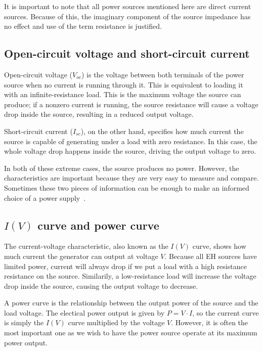\documentclass[a4paper,10pt]{article}
\begin{document}
It is important to note that all power sources mentioned here are direct current sources. Because of this, the imaginary component of the source impedance has no effect and use of the term resistance is justified. 

\subsection{Open-circuit voltage and short-circuit current}

Open-circuit voltage ($V_{oc}$) is the voltage between both terminals of the power source when no current is running through it. This is equivalent to loading it with an infinite-resistance load. This is the maximum voltage the source can produce; if a nonzero current is running, the source resistance will cause a voltage drop inside the source, resulting in a reduced output voltage. 

Short-circuit current ($I_{sc}$), on the other hand, specifies how much current the source is capable of generating under a load with zero resistance. In this case, the whole voltage drop happens inside the source, driving the output voltage to zero. 

In both of these extreme cases, the source produces no power. However, the characteristics are important because they are very easy to measure and compare. Sometimes these two pieces of information can be enough to make an informed choice of a power supply~\cite{Salerno10}. 

\subsection{$I(V)$ curve and power curve}

The current-voltage characteristic, also known as the $I(V)$ curve, shows how much current the generator can output at voltage $V$. Because all \ac{EH} sources have limited power, current will always drop if we put a load with a high resistance resistance on the source. Similarily, a low-resistance load will increase the voltage drop inside the source, causing the output voltage to decrease. 

A power curve is the relationship between the output power of the source and the load voltage. The electical power output is given by $P = V \cdot I$, so the current curve is simply the $I(V)$ curve multiplied by the voltage $V$. However, it is often the most important one as we wish to have the power source operate at its maximum power output. 
\end{document}
